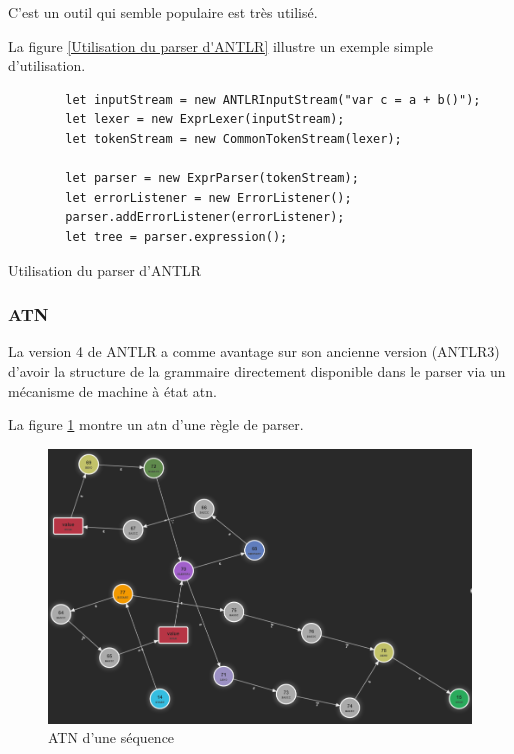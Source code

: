 \documentclass[
    iict, %
    il, %
]{heig-tb}
\begin{document}

C'est un outil qui semble populaire est très utilisé.

La figure \ref{Utilisation du parser d'ANTLR} illustre un exemple simple d'utilisation.

\begin{listing}[!ht]
    \begin{verbatim}
        let inputStream = new ANTLRInputStream("var c = a + b()");
        let lexer = new ExprLexer(inputStream);
        let tokenStream = new CommonTokenStream(lexer);

        let parser = new ExprParser(tokenStream);
        let errorListener = new ErrorListener();
        parser.addErrorListener(errorListener);
        let tree = parser.expression();
    \end{verbatim}
    \caption{Utilisation du parser d'ANTLR}
    \label{Utilisation du parser d'ANTLR}
\end{listing}

\subsubsection{ATN}

La version 4 de ANTLR a comme avantage sur son ancienne version (ANTLR3) d'avoir la structure de la grammaire directement disponible dans le parser via
un mécanisme de machine à état \Gls{atn}.

La figure \ref{ATN d'une séquence} montre un atn d'une règle de parser.

\begin{figure}[!ht]
    \begin{center}
        \includegraphics[width=12cm]{assets/figures/seq_ATN.png}
    \end{center}
    \caption[ATN d'une séquence]{\label{ATN d'une séquence} ATN d'une séquence}
\end{figure}
\end{document}
